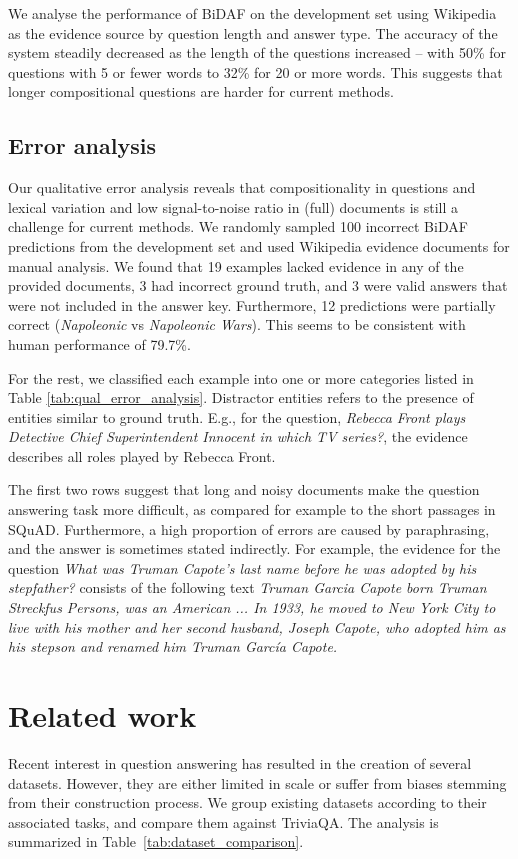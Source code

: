 We analyse the performance of BiDAF on the development set using Wikipedia as the evidence source by question length and answer type. The accuracy of the system steadily decreased as the length of the questions increased -- with 50\% for questions with 5 or fewer words to 32\% for 20 or more words. This suggests that longer compositional questions are harder for current methods. 

\subsection{Error analysis} Our qualitative error analysis reveals that compositionality in questions and lexical variation and low signal-to-noise ratio in (full) documents is still a challenge for current methods. We randomly sampled 100 incorrect BiDAF predictions from the development set and used Wikipedia evidence documents for manual analysis. We found that 19 examples lacked evidence in any of the provided documents, 3 had incorrect ground truth, and 3 were valid answers that were not included in the answer key. Furthermore, 12 predictions were partially correct (\emph{Napoleonic} vs \emph{Napoleonic Wars}). This seems to be consistent with human performance of 79.7\%.

For the rest, we classified each example into one or more categories listed in Table \ref{tab:qual_error_analysis}. Distractor entities refers to the presence of entities similar to ground truth. E.g., for the question, \emph{Rebecca Front plays Detective Chief Superintendent Innocent in which TV series?}, the evidence describes all roles played by Rebecca Front. 

The first two rows suggest that long and noisy documents make the question answering task more difficult, as compared for example to the short passages in SQuAD. Furthermore, a high proportion of errors are caused by paraphrasing, and the answer is sometimes stated indirectly. For example, the evidence for the question \emph{What was Truman Capote's last name before he was adopted by his stepfather?} consists of the following text \emph{Truman Garcia Capote born Truman Streckfus Persons, was an American ... In 1933, he moved to New York City to live with his mother and her second husband, Joseph Capote, who adopted him as his stepson and renamed him Truman García Capote.}

\section{Related work} Recent interest in question answering has resulted in the creation of several datasets. However, they are either limited in scale or suffer from biases stemming from their construction process. We group existing datasets according to their associated tasks, and compare them against TriviaQA. The analysis is summarized in Table~\ref{tab:dataset_comparison}.

